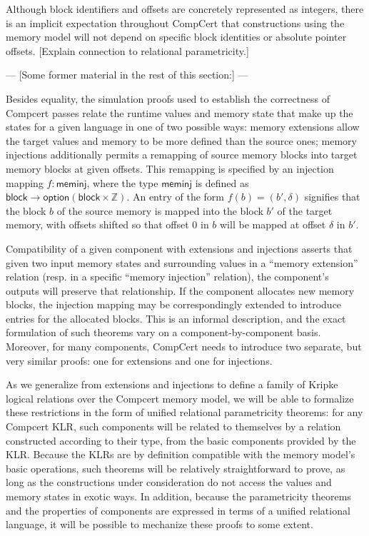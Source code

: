 \documentclass[acmsmall,timestamp,review]{acmart}
\newcommand{\kw}[1]{\ensuremath{ \mathsf{#1} }}
\begin{document}
Although block identifiers and offsets
are concretely represented as integers,
there is an implicit expectation throughout CompCert
that constructions using the memory model
will not depend on specific block identities
or absolute pointer offsets.
[Explain connection to relational parametricity.]

{\color{gray}
--- [Some former material in the rest of this section:] ---

Besides equality,
the simulation proofs used
to establish the correctness of Compcert passes
relate the runtime values and memory state
that make up the states for a given language
in one of two possible ways:
memory extensions
allow the target values and memory to be more defined
than the source ones;
memory injections
additionally permits a remapping of source memory blocks
into target memory blocks at given offsets.
This remapping is specified by an injection mapping
$f : \kw{meminj}$,
where the type $\kw{meminj}$ is defined as
$\kw{block} \rightarrow \kw{option}(\kw{block} \times \mathbb{Z})$.
An entry of the form $f(b) = (b', \delta)$
signifies that the block $b$ of the source memory
is mapped into the block $b'$ of the target memory,
with offsets shifted so that
offset $0$ in $b$ will be mapped at offset $\delta$ in $b'$.

Compatibility of a given component
with extensions and injections
asserts that given two input memory states and surrounding values
in a ``memory extension'' relation
(resp. in a specific ``memory injection'' relation),
the component's outputs will preserve that relationship.
If the component allocates new memory blocks,
the injection mapping may be correspondingly extended
to introduce entries for the allocated blocks.
This is an informal description,
and the exact formulation of such theorems
vary on a component-by-component basis.
Moreover,
for many components,
CompCert needs to introduce two separate,
but very similar proofs:
one for extensions and one for injections.

As we generalize from extensions and injections
to define a family of Kripke logical relations
over the Compcert memory model,
we will be able to formalize these restrictions
in the form of unified relational parametricity theorems:
for any Compcert KLR,
such components will be related to themselves
by a relation constructed according to their type,
from the basic components provided by the KLR.
Because the KLRs are by definition compatible
with the memory model's basic operations,
such theorems will be relatively straightforward to prove,
as long as the constructions under consideration
do not access the values and memory states in exotic ways.
In addition,
because the parametricity theorems
and the properties of components
are expressed in terms of a unified relational language,
it will be possible to mechanize these proofs
to some extent.

}
\end{document}
